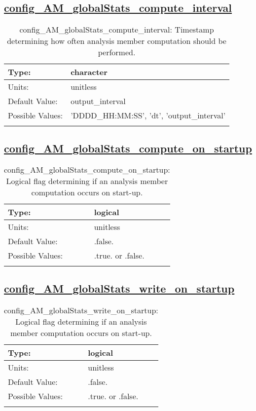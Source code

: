 \subsection[config\_AM\_globalStats\_compute\_interval]{\hyperref[sec:nm_tab_AM_globalStats]{config\_AM\_globalStats\_compute\_interval}}
\label{subsec:nm_sec_config_AM_globalStats_compute_interval}
\begin{center}
\begin{longtable}{| p{2.0in} || p{4.0in} |}
    \hline
    Type: & character \\
    \hline
    Units: & \si{unitless} \\
    \hline
    Default Value: & output\_interval \\
    \hline
    Possible Values: & 'DDDD\_HH:MM:SS', 'dt', 'output\_interval' \\
    \hline
    \caption{config\_AM\_globalStats\_compute\_interval: Timestamp determining how often analysis member computation should be performed.}
\end{longtable}
\end{center}
\subsection[config\_AM\_globalStats\_compute\_on\_startup]{\hyperref[sec:nm_tab_AM_globalStats]{config\_AM\_globalStats\_compute\_on\_startup}}
\label{subsec:nm_sec_config_AM_globalStats_compute_on_startup}
\begin{center}
\begin{longtable}{| p{2.0in} || p{4.0in} |}
    \hline
    Type: & logical \\
    \hline
    Units: & \si{unitless} \\
    \hline
    Default Value: & .false. \\
    \hline
    Possible Values: & .true. or .false. \\
    \hline
    \caption{config\_AM\_globalStats\_compute\_on\_startup: Logical flag determining if an analysis member computation occurs on start-up.}
\end{longtable}
\end{center}
\subsection[config\_AM\_globalStats\_write\_on\_startup]{\hyperref[sec:nm_tab_AM_globalStats]{config\_AM\_globalStats\_write\_on\_startup}}
\label{subsec:nm_sec_config_AM_globalStats_write_on_startup}
\begin{center}
\begin{longtable}{| p{2.0in} || p{4.0in} |}
    \hline
    Type: & logical \\
    \hline
    Units: & \si{unitless} \\
    \hline
    Default Value: & .false. \\
    \hline
    Possible Values: & .true. or .false. \\
    \hline
    \caption{config\_AM\_globalStats\_write\_on\_startup: Logical flag determining if an analysis member computation occurs on start-up.}
\end{longtable}
\end{center}
